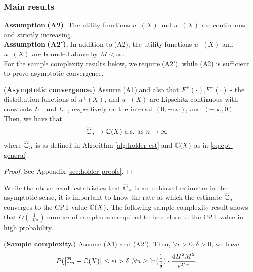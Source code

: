 \subsubsection*{Main results}
\textbf{Assumption (A2).}  The utility functions $u^+(X)$ and $u^-(X)$ are continuous and strictly increasing.\\[1ex]

\textbf{Assumption (A2').}  In addition to (A2), the utility functions $u^+(X)$ and $u^-(X)$ are bounded above by $M<\infty$.\\[1ex]
For the sample complexity results below, we require (A2'), while (A2) is sufficient to prove asymptotic convergence.

\begin{proposition}(\textbf{Asymptotic convergence.})
\label{prop:holder-asymptotic}
Assume (A1) and also that $F^+(\cdot)$,$F^-(\cdot)$ - the distribution functions of $u^+(X)$, and $u^-(X)$ are Lipschitz continuous with constants $L^+$ and $L^-$, respectively on the interval $(0,+\infty)$, and 
$(-\infty, 0)$ . Then, we have that
\begin{align}
\overline {\mathbb{C}}_n
\rightarrow
\mathbb{C}(X)
 \text{   a.s. as } n\rightarrow \infty
\end{align}
where $\overline {\mathbb{C}}_n$ is as defined in Algorithm \ref{alg:holder-est} and $\mathbb{C}(X)$ as in \eqref{eq:cpt-general}.
\end{proposition}
\begin{proof}
See Appendix \ref{sec:holder-proofs}.
\end{proof}
While the above result establishes that $\overline {\mathbb{C}}_n$ is an unbiased estimator in the asymptotic sense, it is important to know the rate at which the estimate $\overline {\mathbb{C}}_n$ converges to the CPT-value $\mathbb{C}(X)$. 
The following sample complexity result shows that $O\left(\frac{1}{\epsilon^{2/\alpha}}\right)$ number of samples are required to be $\epsilon$-close to the CPT-value in high probability.
\begin{proposition}(\textbf{Sample complexity.})
\label{prop:holder-dkw}
Assume (A1) and (A2'). Then, $\forall \epsilon >0, \delta >0$, we have
$$
P(\left |\overline {\mathbb{C}}_n- \mathbb{C}(X) \right| \leq  \epsilon ) > \delta\text{     ,} \forall n \geq \ln(\frac{1}{\delta})\cdot 
\frac{4H^2 M^2}{\epsilon^{2/\alpha}}.$$
\end{proposition}
